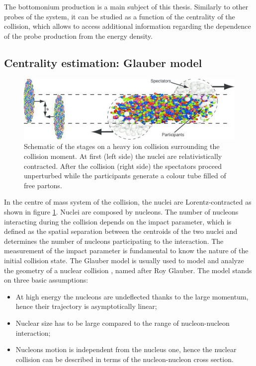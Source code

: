 The bottomonium production is a main subject of this thesis.
Similarly to other probes of the system, it can be studied as a function of the centrality of the collision, which allows to access additional information regarding the dependence of the probe production from the energy density.

\subsection{Centrality estimation: Glauber model}
\label{intro_glauber}

\begin{figure}[!ht]
\begin{center}
\includegraphics[width=0.99\linewidth]{Chapters/Introduction/Figs/collision.pdf}
\caption{Schematic of the stages on a heavy ion collision surrounding the collision moment. At first (left side) the nuclei are relativistically contracted. After the collision (right side) the spectators proceed unperturbed while the participants generate a colour tube filled of free partons.}
\label{fig:collision}
\end{center}
\end{figure}

In the centre of mass system of the collision, the nuclei are Lorentz-contracted as shown in figure \ref{fig:collision}.
Nuclei are composed by nucleons. The number of nucleons interacting during the collision depends on the impact parameter, which is defined as the spatial separation between the centroids of the two nuclei and determines the number of nucleons participating to the interaction.
The measurement of the impact parameter is fundamental to know the nature of the initial collision state.
The Glauber model is usually used to model and analyze the geometry of a nuclear collision , named after Roy Glauber.
The model stands on three basic assumptions:
\begin{itemize}
\item At high energy the nucleons are undeflected thanks to the large momentum, hence their trajectory is asymptotically linear;
\item Nuclear size has to be large compared to the range of nucleon-nucleon interaction;
\item Nucleons motion is independent from the nucleus one, hence the nuclear collision can be described in terms of the nucleon-nucleon cross section.
\end{itemize}

